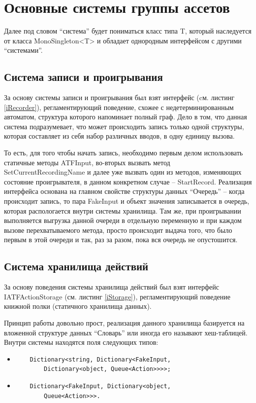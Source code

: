 \section{Основные системы группы ассетов}
Далее под словом ``система'' будет пониматься класс типа T, который наследуется от класса MonoSingleton<T> и обладает однородным интерфейсом с другими ``системами''.

\subsection{Система записи и проигрывания}
За основу системы записи и проигрывания был взят интерфейс (cм. листинг \ref{iRecorder}), регламентирующий поведение, схожее с недетерминированным автоматом, структура которого напоминает полный граф. Дело в том, что данная система подразумевает, что может происходить запись только одной структуры, которая составляет из себя набор различных вводов, в одну единицу вызова.

То есть, для того чтобы начать запись, необходимо первым делом использовать статичные методы ATFInput, во-вторых вызвать метод SetCurrentRecordingName и далее уже вызвать один из методов, изменяющих состояние проигрывателя, в данном конкретном случае -- StartRecord. Реализация интерфейса основана на главном свойстве структуры данных ``Очередь'' -- когда происходит запись, то пара FakeInput и объект значения записывается в очередь, которая распологается внутри системы хранилища. Там же, при проигрывании выполняется выгрузка данной очереди в отдельную переменную и при каждом вызове перехватываемого метода, просто происходит выдача того, что было первым в этой очереди и так, раз за разом, пока вся очередь не опустошится.

\subsection{Система хранилища действий}
За основу поведения системы хранилища действий был взят интерфейс IATFActionStorage (см. листинг \ref{iStorage}), регламентирующий поведение книжной полки (статичного хранилища данных).

Принцип работы довольно прост, реализация данного хранилища базируется на вложенной структуре данных ``Словарь'' или иногда его называют хеш-таблицей. Внутри системы находятся поля следующих типов:
\begin{itemize}
	\item 
	\begin{verbatim}
	Dictionary<string, Dictionary<FakeInput, 
		Dictionary<object, Queue<Action>>>>;
	\end{verbatim}
	\item 
	\begin{verbatim}
	Dictionary<FakeInput, Dictionary<object, 
		Queue<Action>>>.
	\end{verbatim}
\end{itemize}

